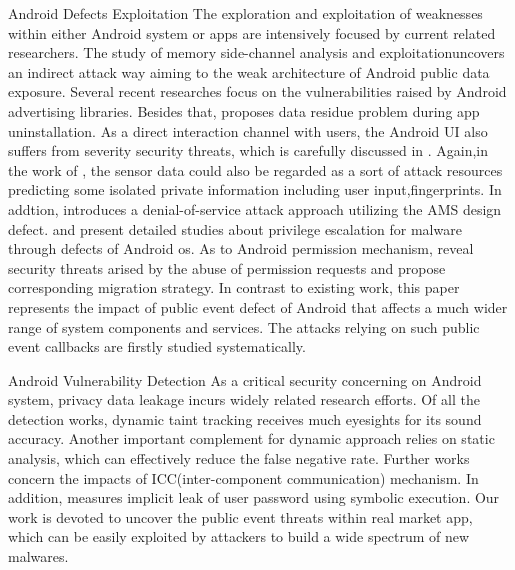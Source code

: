 \documentclass{sig-alternate-05-2015}
\begin{document}
Android Defects Exploitation
The exploration and exploitation of weaknesses within either Android system or apps are intensively focused by current related researchers. The study of memory side-channel analysis and exploitation\cite{zhou2013identity, chen2014peeking, jana2012memento}uncovers an indirect attack way aiming to the weak architecture of Android public data exposure.
Several recent researches focus on the vulnerabilities raised by Android advertising libraries\cite{soteris2016free}\cite{sooel2016mob_ads}. Besides that, \cite{zhang2016life} proposes data residue problem during app uninstallation. As a direct interaction channel with users, the Android UI also suffers from severity security threats, which is carefully discussed in \cite{ren2015towards}\cite{bianchi2015app}\cite{akhawe2014clickjacking}\cite{luo2012touchjacking}\cite{huang2012clickjacking}\cite{roesner2013securing}\cite{lin2014screenmilker}. 
Again,in the work of \cite{mylonas2013smartphone}\cite{xu2012taplogger}\cite{miluzzo2012tapprints}, the sensor data could also be regarded as a sort of attack resources predicting some isolated private information including user input,fingerprints. In addtion, \cite{armando2012dos} introduces a denial-of-service attack approach utilizing the AMS design defect. \cite{xing2014upgrading} and \cite{bugiel2012towards} present detailed studies about privilege escalation for malware through defects of Android os.  As to Android permission mechanism, \cite{felt2011android}\cite{au2012pscout}\cite{zhang2013vetting}\cite{fang2014permission} reveal security threats arised by the abuse of permission requests and propose corresponding migration strategy.
In contrast to existing work, this paper represents the impact of public event defect of Android that affects a much wider range of system components and services. The attacks relying on such public event callbacks are firstly studied systematically.

Android Vulnerability Detection
As a critical security concerning on Android system, privacy data leakage incurs widely related research efforts. 
Of all the detection works, dynamic taint tracking \cite{enck2014taintdroid}\cite{klieber2014android}\cite{rastogi2013appsplayground}\cite{poeplau2014execute} receives much eyesights for its sound accuracy.
Another important complement for dynamic approach relies on static analysis\cite{lu2012chex}\cite{arzt2014flowdroid}\cite{gordon2015DroidSafe}, which can effectively reduce the false negative rate. Further works concern the impacts of ICC(inter-component communication) mechanism\cite{cao2015edgeminer}\cite{octeau2013epicc}\cite{li2015iccta}. In addition,
\cite{cox2014spandex} measures implicit leak of user password using symbolic execution. Our work is devoted to uncover the public event threats within real market app, which can be easily exploited by attackers to build a wide spectrum of new malwares. 
\end{document}
